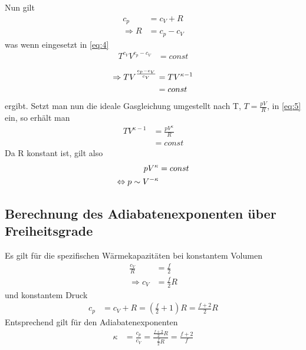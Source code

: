 \documentclass[12pt, a4paper, twoside]{scrartcl}
\begin{document}
Nun gilt 
\begin{align*}
c_p &= c_V + R \\
\Rightarrow R &= c_p - c_V
\end{align*}
was wenn eingesetzt in \ref{eq:4} 
\begin{align*}
T^{c_V}V^{c_p - c_V} &= const \\
\end{align*}
\begin{align}
\label{eq:5}
\Rightarrow TV^{\frac{c_p - c_V}{c_V}} &= TV^{\kappa - 1}\\
&= const \nonumber
\end{align}
ergibt. Setzt man nun die ideale Gasgleichung umgestellt nach T, $T = \frac{pV}{R}$, in \ref{eq:5} ein, so erhält man
\begin{align*}
TV^{\kappa -1} &= \frac{pV^{\kappa}}{R} \\
&= const
\end{align*}
Da R konstant ist, gilt also
\begin{align*}
pV^{\kappa} &= const \\
\mathrel{\Leftrightarrow} p \sim V^{-\kappa}
\end{align*}

\subsection{Berechnung des Adiabatenexponenten über Freiheitsgrade}
Es gilt für die spezifischen Wärmekapazitäten bei konstantem Volumen
\begin{align*}
\frac{c_V}{R} &= \frac{f}{2} \\
\Rightarrow c_V &= \frac{f}{2}R
\end{align*}
und konstantem Druck
\begin{align*}
c_p &= c_V + R = \left( \frac{f}{2} + 1\right)R = \frac{f + 2}{2}R
\end{align*} 
Entsprechend gilt für den Adiabatenexponenten
\begin{align*}
\kappa &= \frac{c_p}{c_V} = \frac{\frac{f+2}{2}R}{\frac{f}{2}R} = \frac{f+2}{f}
\end{align*}
\end{document}

